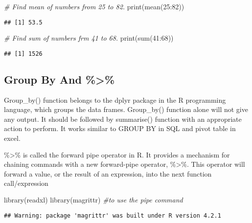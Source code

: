 \documentclass[
]{article}
\newenvironment{Shaded}{\begin{snugshade}}{\end{snugshade}}
\newcommand{\CommentTok}[1]{\textcolor[rgb]{0.56,0.35,0.01}{\textit{#1}}}
\newcommand{\DecValTok}[1]{\textcolor[rgb]{0.00,0.00,0.81}{#1}}
\newcommand{\FunctionTok}[1]{\textcolor[rgb]{0.00,0.00,0.00}{#1}}
\newcommand{\NormalTok}[1]{#1}
\newcommand{\SpecialCharTok}[1]{\textcolor[rgb]{0.00,0.00,0.00}{#1}}
\begin{document}
\begin{Shaded}
\begin{Highlighting}[]
\CommentTok{\# Find mean of numbers from 25 to 82.}
\FunctionTok{print}\NormalTok{(}\FunctionTok{mean}\NormalTok{(}\DecValTok{25}\SpecialCharTok{:}\DecValTok{82}\NormalTok{))}
\end{Highlighting}
\end{Shaded}

\begin{verbatim}
## [1] 53.5
\end{verbatim}

\begin{Shaded}
\begin{Highlighting}[]
\CommentTok{\# Find sum of numbers frm 41 to 68.}
\FunctionTok{print}\NormalTok{(}\FunctionTok{sum}\NormalTok{(}\DecValTok{41}\SpecialCharTok{:}\DecValTok{68}\NormalTok{))}
\end{Highlighting}
\end{Shaded}

\begin{verbatim}
## [1] 1526
\end{verbatim}

\hypertarget{group-by-and}{%
\subsection{Group By And \%\textgreater\%}\label{group-by-and}}

Group\_by() function belongs to the dplyr package in the R programming
language, which groups the data frames. Group\_by() function alone will
not give any output. It should be followed by summarise() function with
an appropriate action to perform. It works similar to GROUP BY in SQL
and pivot table in excel.

\%\textgreater\% is called the forward pipe operator in R. It provides a
mechanism for chaining commands with a new forward-pipe operator,
\%\textgreater\%. This operator will forward a value, or the result of
an expression, into the next function call/expression

\begin{Shaded}
\begin{Highlighting}[]
\FunctionTok{library}\NormalTok{(readxl)}
\FunctionTok{library}\NormalTok{(magrittr) }\CommentTok{\#to use the pipe command}
\end{Highlighting}
\end{Shaded}

\begin{verbatim}
## Warning: package 'magrittr' was built under R version 4.2.1
\end{verbatim}
\end{document}
